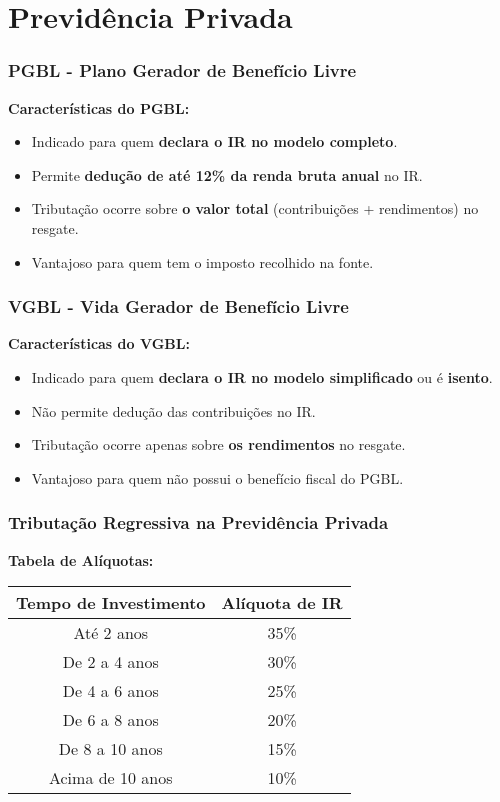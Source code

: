 \section{Previdência Privada}

\begin{frame}[t]\frametitle{PGBL - Plano Gerador de Benefício Livre}
  \textbf{Características do PGBL:}
  \begin{itemize}
    \item Indicado para quem \textbf{declara o IR no modelo completo}.
    \item Permite \textbf{dedução de até 12\% da renda bruta anual} no IR.
    \item Tributação ocorre sobre \textbf{o valor total} (contribuições + rendimentos) no resgate.
    \item Vantajoso para quem tem o imposto recolhido na fonte.
  \end{itemize}
\end{frame}

\begin{frame}[t]\frametitle{VGBL - Vida Gerador de Benefício Livre}
  \textbf{Características do VGBL:}
  \begin{itemize}
    \item Indicado para quem \textbf{declara o IR no modelo simplificado} ou é \textbf{isento}.
    \item Não permite dedução das contribuições no IR.
    \item Tributação ocorre apenas sobre \textbf{os rendimentos} no resgate.
    \item Vantajoso para quem não possui o benefício fiscal do PGBL.
  \end{itemize}
\end{frame}

\begin{frame}[t]\frametitle{Tributação Regressiva na Previdência Privada}

  \vspace{0.5cm}
  \textbf{Tabela de Alíquotas:}

  \begin{table}[]
    \centering
    \begin{tabular}{|c|c|}
      \hline
      \textbf{Tempo de Investimento} & \textbf{Alíquota de IR} \\ \hline
      Até 2 anos                     & 35\%                    \\ \hline
      De 2 a 4 anos                  & 30\%                    \\ \hline
      De 4 a 6 anos                  & 25\%                    \\ \hline
      De 6 a 8 anos                  & 20\%                    \\ \hline
      De 8 a 10 anos                 & 15\%                    \\ \hline
      Acima de 10 anos               & 10\%                    \\ \hline
    \end{tabular}
  \end{table}
\end{frame}

